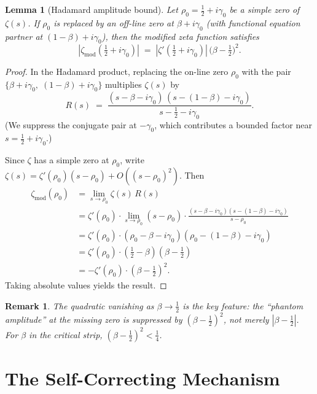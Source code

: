 \documentclass[11pt,a4paper]{article}
\newtheorem{lemma}[theorem]{Lemma}
\newtheorem{remark}[theorem]{Remark}
\begin{document}
\begin{lemma}[Hadamard amplitude bound]\label{lem:hadamard}
Let $\rho_0 = \frac{1}{2} + i\gamma_0$ be a simple zero of $\zeta(s)$.
If $\rho_0$ is replaced by an off-line zero at $\beta + i\gamma_0$ (with functional equation partner at $(1-\beta) + i\gamma_0$), then the modified zeta function satisfies
\[
|\zeta_{\mathrm{mod}}(\tfrac{1}{2} + i\gamma_0)| \;=\; |\zeta'(\tfrac{1}{2} + i\gamma_0)|\,\bigl(\beta - \tfrac{1}{2}\bigr)^2.
\]
\end{lemma}

\begin{proof}
In the Hadamard product, replacing the on-line zero $\rho_0$ with the pair $\{\beta + i\gamma_0,\; (1-\beta)+i\gamma_0\}$ multiplies $\zeta(s)$ by
\[
R(s) \;=\; \frac{(s - \beta - i\gamma_0)\,(s - (1-\beta) - i\gamma_0)}{s - \tfrac{1}{2} - i\gamma_0}.
\]
(We suppress the conjugate pair at $-\gamma_0$, which contributes a bounded factor near $s = \frac{1}{2}+i\gamma_0$.)

Since $\zeta$ has a simple zero at $\rho_0$, write $\zeta(s) = \zeta'(\rho_0)(s - \rho_0) + O((s-\rho_0)^2)$.
Then
\begin{align*}
\zeta_{\mathrm{mod}}(\rho_0) &= \lim_{s \to \rho_0} \zeta(s)\,R(s) \\
&= \zeta'(\rho_0) \cdot \lim_{s \to \rho_0} (s - \rho_0) \cdot \frac{(s - \beta - i\gamma_0)(s - (1-\beta) - i\gamma_0)}{s - \rho_0} \\
&= \zeta'(\rho_0) \cdot (\rho_0 - \beta - i\gamma_0)(\rho_0 - (1-\beta) - i\gamma_0) \\
&= \zeta'(\rho_0) \cdot (\tfrac{1}{2} - \beta)(\beta - \tfrac{1}{2}) \\
&= -\zeta'(\rho_0) \cdot (\beta - \tfrac{1}{2})^2.
\end{align*}
Taking absolute values yields the result.
\end{proof}

\begin{remark}
The quadratic vanishing as $\beta \to \frac{1}{2}$ is the key feature: the ``phantom amplitude'' at the missing zero is suppressed by $(\beta - \frac{1}{2})^2$, not merely $|\beta - \frac{1}{2}|$.
For $\beta$ in the critical strip, $(\beta - \frac{1}{2})^2 < \frac{1}{4}$.
\end{remark}


\section{The Self-Correcting Mechanism}
\end{document}
